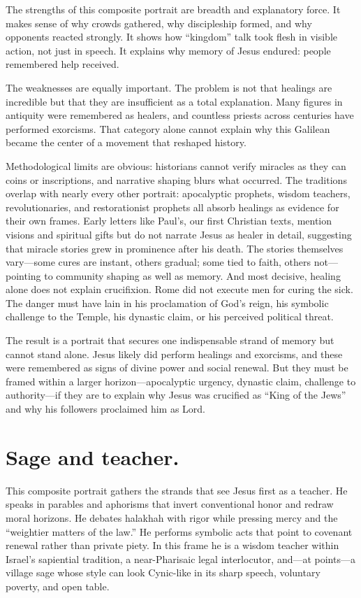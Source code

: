 The strengths of this composite portrait are breadth and explanatory force.
It makes sense of why crowds gathered, why discipleship formed, and why opponents reacted strongly.
It shows how “kingdom” talk took flesh in visible action, not just in speech.
It explains why memory of Jesus endured: people remembered help received.

The weaknesses are equally important.
The problem is not that healings are incredible but that they are insufficient as a total explanation.
Many figures in antiquity were remembered as healers, and countless priests across centuries have performed exorcisms.
That category alone cannot explain why this Galilean became the center of a movement that reshaped history.

Methodological limits are obvious: historians cannot verify miracles as they can coins or inscriptions, and narrative shaping blurs what occurred.
The traditions overlap with nearly every other portrait: apocalyptic prophets, wisdom teachers, revolutionaries, and restorationist prophets all absorb healings as evidence for their own frames.
Early letters like Paul’s, our first Christian texts, mention visions and spiritual gifts but do not narrate Jesus as healer in detail, suggesting that miracle stories grew in prominence after his death.
The stories themselves vary—some cures are instant, others gradual; some tied to faith, others not—pointing to community shaping as well as memory.
And most decisive, healing alone does not explain crucifixion.
Rome did not execute men for curing the sick.
The danger must have lain in his proclamation of God’s reign, his symbolic challenge to the Temple, his dynastic claim, or his perceived political threat.

The result is a portrait that secures one indispensable strand of memory but cannot stand alone.
Jesus likely did perform healings and exorcisms, and these were remembered as signs of divine power and social renewal.
But they must be framed within a larger horizon—apocalyptic urgency, dynastic claim, challenge to authority—if they are to explain why Jesus was crucified as “King of the Jews” and why his followers proclaimed him as Lord.

\section{Sage and teacher.}

This composite portrait gathers the strands that see Jesus first as a teacher.
He speaks in parables and aphorisms that invert conventional honor and redraw moral horizons.
He debates halakhah with rigor while pressing mercy and the “weightier matters of the law.”
He performs symbolic acts that point to covenant renewal rather than private piety.
In this frame he is a wisdom teacher within Israel’s sapiential tradition, a near-Pharisaic legal interlocutor, and—at points—a village sage whose style can look Cynic-like in its sharp speech, voluntary poverty, and open table.


